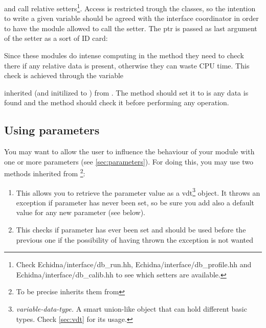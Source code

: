 and call relative setters\footnote{Check Echidna/interface/db\_run.hh, Echidna/interface/db\_profile.hh and Echidna/interface/db\_calib.hh to see which setters are available.}.
Access is restricted trough the  classes, so the intention to write a given variable should be agreed with the interface coordinator in order to have the module allowed to call the setter.
The ptr  is passed as last argument of the setter as a sort of ID card:


Since these modules do intense computing in the  method they need to check there if any relative data is present, otherwise they can waste CPU time.
This check is achieved through the variable 


inherited (and initilized to ) from .
The  method should set it to  is any data is found and the  method should check it before performing any operation.


\subsection{Using parameters}

You may want to allow the user to influence the behaviour of your module with one or more parameters (see \ref{sec:parameters}). 
For doing this, you may use two methods inherited from \footnote{To be precise  inherits them from }:
\begin{enumerate}
\item

  This allows you to retrieve the parameter value as a vdt\footnote{\emph{variable-data-type.} A smart union-like object that can hold different basic types. Check \ref{sec:vdt} for its usage.} object. 
  It throws an exception if parameter has never been set, so be sure you add also a default value for any new parameter (see below).

\item

  This checks if parameter has ever been set and should be used before the previous one if the possibility of having thrown the exception is not wanted

\end{enumerate}

